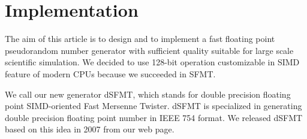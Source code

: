 \documentclass{svmult}
\begin{document}





\section{Implementation}
\label{sec:implement}

The aim of this article is to design and to implement a fast floating
point pseudorandom number generator with sufficient quality suitable
for large scale scientific simulation. We decided to use 128-bit
operation customizable in SIMD feature of modern CPUs because we 
succeeded in SFMT.

We call our new generator dSFMT, which stands for double precision
floating point SIMD-oriented Fast Mersenne Twister. dSFMT is
specialized in generating double precision floating point number in
IEEE 754 format.  We released dSFMT based on this idea in 2007 from
our web page\cite{web:SFMT}.
\end{document}
